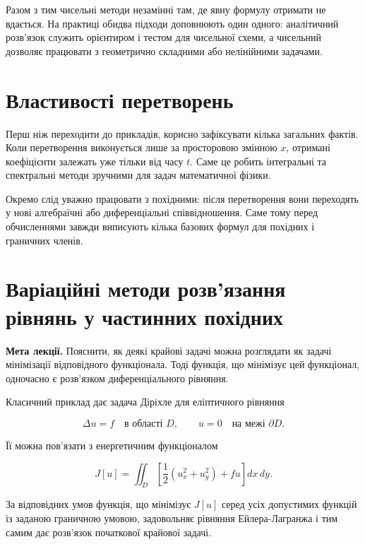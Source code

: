 \documentclass[
  ukrainian,
]{article}
\begin{document}
Разом з тим чисельні методи незамінні там, де явну формулу отримати не
вдається. На практиці обидва підходи доповнюють один одного: аналітичний
розв'язок служить орієнтиром і тестом для чисельної схеми, а чисельний
дозволяє працювати з геометрично складними або нелінійними задачами.

\section{Властивості
перетворень}\label{ux432ux43bux430ux441ux442ux438ux432ux43eux441ux442ux456-ux43fux435ux440ux435ux442ux432ux43eux440ux435ux43dux44c}

Перш ніж переходити до прикладів, корисно зафіксувати кілька загальних
фактів. Коли перетворення виконується лише за просторовою змінною \(x\),
отримані коефіцієнти залежать уже тільки від часу \(t\). Саме це робить
інтегральні та спектральні методи зручними для задач математичної
фізики.

Окремо слід уважно працювати з похідними: після перетворення вони
переходять у нові алгебраїчні або диференціальні співвідношення. Саме
тому перед обчисленнями завжди виписують кілька базових формул для
похідних і граничних членів.

\section{Варіаційні методи розв'язання рівнянь у частинних
похідних}\label{ux432ux430ux440ux456ux430ux446ux456ux439ux43dux456-ux43cux435ux442ux43eux434ux438-ux440ux43eux437ux432ux44fux437ux430ux43dux43dux44f-ux440ux456ux432ux43dux44fux43dux44c-ux443-ux447ux430ux441ux442ux438ux43dux43dux438ux445-ux43fux43eux445ux456ux434ux43dux438ux445}

\textbf{Мета лекції.} Пояснити, як деякі крайові задачі можна розглядати
як задачі мінімізації відповідного функціонала. Тоді функція, що
мінімізує цей функціонал, одночасно є розв'язком диференціального
рівняння.

Класичний приклад дає задача Діріхле для еліптичного рівняння

\[
\Delta u = f \quad \text{в області } D, \qquad u = 0 \quad \text{на межі } \partial D.
\]

Її можна пов'язати з енергетичним функціоналом

\[
J[u] = \iint_D \left[ \frac{1}{2}\left(u_x^2 + u_y^2\right) + fu \right] dx\,dy.
\]

За відповідних умов функція, що мінімізує \(J[u]\) серед усіх допустимих
функцій із заданою граничною умовою, задовольняє рівняння
Ейлера-Лагранжа і тим самим дає розв'язок початкової крайової задачі.
\end{document}

